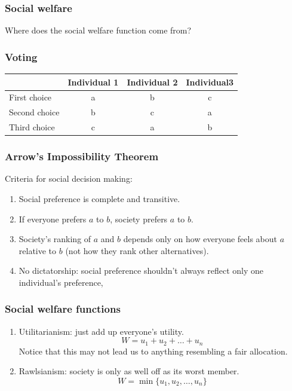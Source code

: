 \documentclass[xcolor=pdftex,dvipsnames]{beamer}
\begin{document}
\begin{frame}
  \frametitle{Social welfare}
  Where does the social welfare function come from?
\bigskip

\bigskip


\bigskip
{}

\bigskip
{}
\end{frame}


\begin{frame}
  \frametitle{Voting}
  \begin{tabular}{|l|c|c|c|}
    \hline & Individual 1  & Individual 2 & Individual3\\
\hline First choice & a & b & c \\
\hline Second choice & b & c & a \\
\hline Third choice & c & a & b \\
\hline
  \end{tabular}
\bigskip

\end{frame}



\begin{frame}
  \frametitle{Arrow's Impossibility Theorem}
  Criteria for social decision making:
  \begin{enumerate}[<+->]
  \item  Social preference is complete and transitive.
  \item If everyone prefers $a$ to $b$, society prefers $a$ to $b$.
  \item Society's ranking of $a$ and $b$ depends only on how everyone
    feels about $a$ relative to $b$ (not how they rank other
    alternatives).
  \item No dictatorship: social preference shouldn't always reflect
    only one individual's preference,
  \end{enumerate}

\end{frame}


\begin{frame}
  \frametitle{Social welfare functions}
  \begin{enumerate}[<+->]
  \item  Utilitarianism: just add up everyone's utility.
    \[ W = u_1 + u_2 + \dots + u_n
    \]
    Notice that this may not lead us to anything resembling a fair allocation.
  \item Rawlsianism: society is only as well off as its worst member.
    \[
    W = \min\{u_1, u_2,\dots, u_n\}
    \]
  \end{enumerate}

  
\end{frame}
\end{document}
